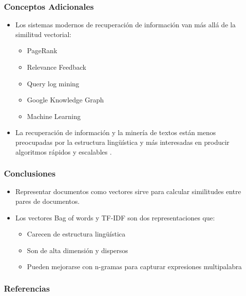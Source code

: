 \documentclass[handout]{beamer}
\begin{document}
\begin{frame}\frametitle{Conceptos Adicionales}
\begin{itemize}
 \item Los sistemas modernos de recuperación de información van más allá de la similitud vectorial:
   \begin{itemize}
     \item PageRank
     \item Relevance Feedback
     \item Query log mining
     \item Google Knowledge Graph
     \item Machine Learning
   \end{itemize}
 \item La recuperación de información y la minería de textos están menos preocupadas por la estructura lingüística y más interesadas en producir algoritmos rápidos y escalables \cite{jacobbook}.
\end{itemize}
\end{frame}

\begin{frame}\frametitle{Conclusiones}
\begin{itemize}
 \item Representar documentos como vectores sirve para calcular similitudes entre pares de documentos.
 \item Los vectores Bag of words y TF-IDF son dos representaciones que:
   \begin{itemize}
     \item Carecen de estructura lingüística
     \item Son de alta dimensión y dispersos
     \item Pueden mejorarse con n-gramas para capturar expresiones multipalabra
   \end{itemize}
\end{itemize}
\end{frame}

\begin{frame}[allowframebreaks]\scriptsize
\frametitle{Referencias}


%
\end{frame}



\end{document}
